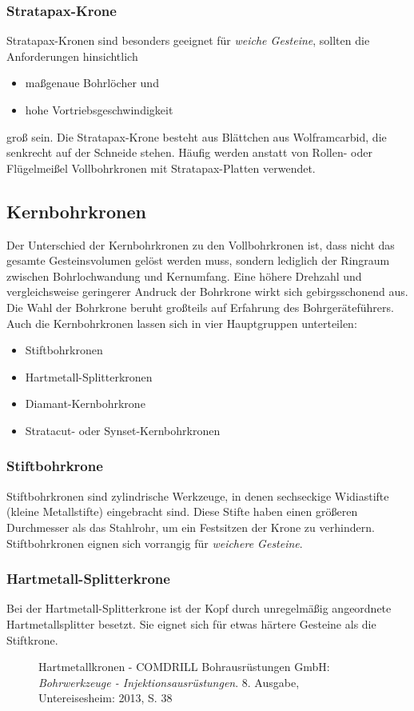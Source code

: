 \documentclass[12pt,a4paper,draft]{scrartcl} %
\begin{document}
\subsubsection{Stratapax-Krone}
Stratapax-Kronen sind besonders geeignet für \emph{weiche Gesteine}, sollten die Anforderungen hinsichtlich
\begin{itemize}
\item maßgenaue Bohrlöcher und
\item hohe Vortriebsgeschwindigkeit
\end{itemize}
groß sein. Die Stratapax-Krone besteht aus Blättchen aus Wolframcarbid, die senkrecht auf der Schneide stehen. Häufig werden anstatt von Rollen- oder Flügelmeißel Vollbohrkronen mit Stratapax-Platten verwendet.

\subsection{Kernbohrkronen}
Der Unterschied der Kernbohrkronen zu den Vollbohrkronen ist, dass nicht das gesamte Gesteinsvolumen gelöst werden muss, sondern lediglich der Ringraum zwischen Bohrlochwandung und Kernumfang. Eine höhere Drehzahl und vergleichsweise geringerer Andruck der Bohrkrone wirkt sich gebirgsschonend aus. Die Wahl der Bohrkrone beruht großteils auf Erfahrung des Bohrgeräteführers. Auch die Kernbohrkronen lassen sich in vier Hauptgruppen unterteilen:

\begin{itemize}
\item Stiftbohrkronen
\item Hartmetall-Splitterkronen
\item Diamant-Kernbohrkrone
\item Stratacut- oder Synset-Kernbohrkronen
\end{itemize}

\subsubsection{Stiftbohrkrone}
Stiftbohrkronen sind zylindrische Werkzeuge, in denen sechseckige Widiastifte (kleine Metallstifte) eingebracht sind. Diese Stifte haben einen größeren Durchmesser als das Stahlrohr, um ein Festsitzen der Krone zu verhindern. Stiftbohrkronen eignen sich vorrangig für \emph{weichere Gesteine}.\\

\newpage	
\subsubsection{Hartmetall-Splitterkrone}
Bei der Hartmetall-Splitterkrone ist der Kopf durch unregelmäßig angeordnete Hartmetallsplitter besetzt. Sie eignet sich für etwas härtere Gesteine als die Stiftkrone.
\\
\begin{figure}[H]
\centering
\caption{Hartmetallkronen - COMDRILL Bohrausrüstungen GmbH: \emph{Bohrwerkzeuge - Injektionsausrüstungen}. 8. Ausgabe, Untereisesheim: 2013, S. 38}
\end{figure}
\end{document}
